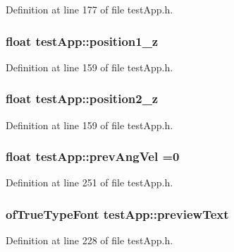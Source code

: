 Definition at line 177 of file test\-App.\-h.

\hypertarget{classtest_app_a808376783cdf510335cd1b37026e9bb3}{
\subsubsection[{position1\-\_\-z}]{\setlength{\rightskip}{0pt plus 5cm}float test\-App\-::position1\-\_\-z}}\label{classtest_app_a808376783cdf510335cd1b37026e9bb3}


Definition at line 159 of file test\-App.\-h.

\hypertarget{classtest_app_a0720011cfaade6388109232ea4927c19}{
\subsubsection[{position2\-\_\-z}]{\setlength{\rightskip}{0pt plus 5cm}float test\-App\-::position2\-\_\-z}}\label{classtest_app_a0720011cfaade6388109232ea4927c19}


Definition at line 159 of file test\-App.\-h.

\hypertarget{classtest_app_a8a2b9b9cf76097e20f148b616297029b}{
\subsubsection[{prev\-Ang\-Vel}]{\setlength{\rightskip}{0pt plus 5cm}float test\-App\-::prev\-Ang\-Vel =0}}\label{classtest_app_a8a2b9b9cf76097e20f148b616297029b}


Definition at line 251 of file test\-App.\-h.

\hypertarget{classtest_app_af5b1af55af2256ef3751de075fc7a9cc}{
\subsubsection[{preview\-Text}]{\setlength{\rightskip}{0pt plus 5cm}of\-True\-Type\-Font test\-App\-::preview\-Text}}\label{classtest_app_af5b1af55af2256ef3751de075fc7a9cc}


Definition at line 228 of file test\-App.\-h.

